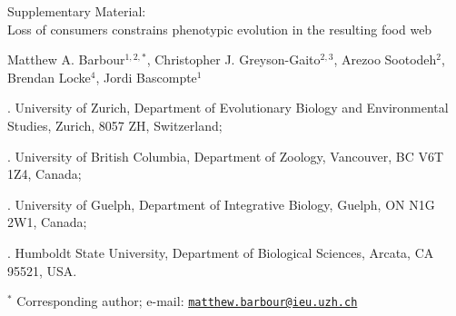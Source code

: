\documentclass[11pt,]{article}
\title{}
\author{}
\date{}
\begin{document}
\vspace*{0.1cm}

\begin{center} \LARGE Supplementary Material: \\
Loss of consumers constrains phenotypic evolution in the resulting food web \end{center}

\bigskip

\begin{center} \large Matthew A. Barbour$^{1,2,\ast}$, Christopher J. Greyson-Gaito$^{2,3}$, Arezoo Sootodeh$^{2}$, Brendan Locke$^{4}$, Jordi Bascompte$^{1}$ \normalsize \end{center}

\bigskip

. University of Zurich, Department of Evolutionary Biology
and Environmental Studies, Zurich, 8057 ZH, Switzerland;

. University of British Columbia, Department of Zoology,
Vancouver, BC V6T 1Z4, Canada;

. University of Guelph, Department of Integrative Biology,
Guelph, ON N1G 2W1, Canada;

. Humboldt State University, Department of Biological
Sciences, Arcata, CA 95521, USA.

\(^\ast\) Corresponding author; e-mail:
\href{mailto:matthew.barbour@ieu.uzh.ch}{\nolinkurl{matthew.barbour@ieu.uzh.ch}}

\linenumbers{} \modulolinenumbers[3]

\newcommand{\beginsupplement}{%
        \setcounter{table}{0}
        \renewcommand{\thetable}{S\arabic{table}}%
        \setcounter{figure}{0}
        \renewcommand{\thefigure}{S\arabic{figure}}%
     }

\newpage

\beginsupplement
\end{document}
